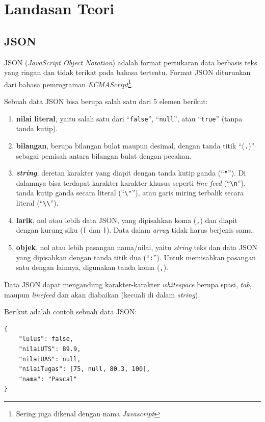 \chapter{Landasan Teori}

\section{JSON}

JSON (\textit{JavaScript Object Notation}) adalah format pertukaran data berbasis teks yang ringan dan tidak terikat pada bahasa tertentu\cite{rfc7159}. Format JSON diturunkan dari bahasa pemrograman \textit{ECMAScript}\footnote{Sering juga dikenal dengan nama \textit{Javascript}}.

Sebuah data JSON bisa berupa salah satu dari 5 elemen berikut:

\begin{enumerate}
	\item \textbf{nilai literal}, yaitu salah satu dari ``\texttt{false}'', ``\texttt{null}'', atau ``\texttt{true}'' (tanpa tanda kutip).
	\item \textbf{bilangan}, berupa bilangan bulat maupun desimal, dengan tanda titik ``(\texttt{.})'' sebagai pemisah antara bilangan bulat dengan pecahan.
	\item \textbf{\textit{string}}, deretan karakter yang diapit dengan tanda kutip ganda (``\verb/"/''). Di dalamnya bisa terdapat karakter karakter khusus seperti \textit{line feed} (``\verb/\n/''), tanda kutip ganda secara literal (``\verb/\"/''), atau garis miring terbalik secara literal (``\verb/\\/'').
	\item \textbf{larik}, nol atau lebih data JSON, yang dipisahkan koma (\verb/,/) dan diapit dengan kurung siku (\verb/[/ dan \verb/]/). Data dalam \textit{array} tidak harus berjenis sama.
	\item \textbf{objek}, nol atau lebih pasangan nama/nilai, yaitu \textit{string} teks dan data JSON yang dipisahkan dengan tanda titik dua (``\verb/:/''). Untuk memisahkan pasangan satu dengan lainnya, digunakan tanda koma (\verb/,/).
\end{enumerate}

Data JSON dapat mengandung karakter-karakter \textit{whitespace} berupa spasi, \textit{tab}, maupun \textit{linefeed} dan akan diabaikan (kecuali di dalam \textit{string}).

Berikut adalah contoh sebuah data JSON:

\begin{lstlisting}
{
	"lulus": false,
	"nilaiUTS": 89.9,
	"nilaiUAS": null,
	"nilaiTugas": [75, null, 80.3, 100],
	"nama": "Pascal"
}
\end{lstlisting}

